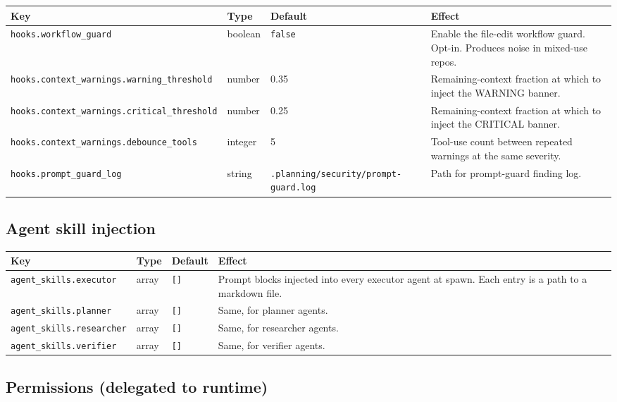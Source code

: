 \documentclass[11pt,letterpaper,openany]{book}
\begin{document}
\begin{center}
\footnotesize
\begin{longtable}{lll p{5.6cm}}
\toprule
Key & Type & Default & Effect \\
\midrule
\endhead
\texttt{hooks.workflow\_guard} & boolean & \texttt{false} & Enable the file-edit workflow guard. Opt-in. Produces noise in mixed-use repos. \\
\texttt{hooks.context\_warnings.warning\_threshold} & number & 0.35 & Remaining-context fraction at which to inject the WARNING banner. \\
\texttt{hooks.context\_warnings.critical\_threshold} & number & 0.25 & Remaining-context fraction at which to inject the CRITICAL banner. \\
\texttt{hooks.context\_warnings.debounce\_tools} & integer & 5 & Tool-use count between repeated warnings at the same severity. \\
\texttt{hooks.prompt\_guard\_log} & string & \texttt{.planning/security/prompt-guard.log} & Path for prompt-guard finding log. \\
\bottomrule
\end{longtable}
\end{center}

\subsection*{Agent skill injection}

\begin{center}
\footnotesize
\begin{longtable}{lll p{5.6cm}}
\toprule
Key & Type & Default & Effect \\
\midrule
\endhead
\texttt{agent\_skills.executor} & array & \texttt{[]} & Prompt blocks injected into every executor agent at spawn. Each entry is a path to a markdown file. \\
\texttt{agent\_skills.planner} & array & \texttt{[]} & Same, for planner agents. \\
\texttt{agent\_skills.researcher} & array & \texttt{[]} & Same, for researcher agents. \\
\texttt{agent\_skills.verifier} & array & \texttt{[]} & Same, for verifier agents. \\
\bottomrule
\end{longtable}
\end{center}

\subsection*{Permissions (delegated to runtime)}
\end{document}

